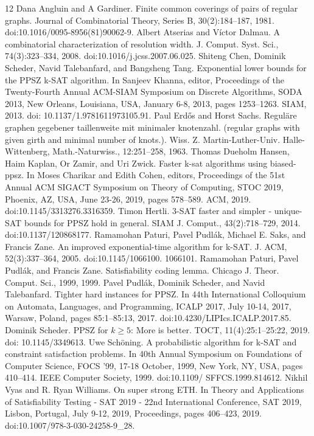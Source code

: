 \begin{thebibliography}{12}
 Dana Angluin and A Gardiner. Finite common coverings of pairs of regular graphs. Journal of Combinatorial Theory, Series B, 30(2):184–187, 1981. doi:10.1016/0095-8956(81)90062-9.
 Albert Atserias and Víctor Dalmau. A combinatorial characterization of resolution width. J. Comput. Syst. Sci., 74(3):323–334, 2008. doi:10.1016/j.jcss.2007.06.025.
 Shiteng Chen, Dominik Scheder, Navid Talebanfard, and Bangsheng Tang. Exponential lower bounds for the PPSZ k-SAT algorithm. In Sanjeev Khanna, editor, Proceedings of the Twenty-Fourth Annual ACM-SIAM Symposium on Discrete Algorithms, SODA 2013, New Orleans, Louisiana, USA, January 6-8, 2013, pages 1253–1263. SIAM, 2013. doi: 10.1137/1.9781611973105.91.
 Paul Erdős and Horst Sachs. Reguläre graphen gegebener taillenweite mit minimaler knotenzahl. (regular graphs with given girth and minimal number of knots.). Wiss. Z. Martin-Luther-Univ. Halle-Wittenberg, Math.-Naturwiss., 12:251–258, 1963.
 Thomas Dueholm Hansen, Haim Kaplan, Or Zamir, and Uri Zwick. Faster k-sat algorithms using biased-ppsz. In Moses Charikar and Edith Cohen, editors, Proceedings of the 51st Annual ACM SIGACT Symposium on Theory of Computing, STOC 2019, Phoenix, AZ, USA, June 23-26, 2019, pages 578–589. ACM, 2019. doi:10.1145/3313276.3316359.
 Timon Hertli. 3-SAT faster and simpler - unique-SAT bounds for PPSZ hold in general. SIAM J. Comput., 43(2):718–729, 2014. doi:10.1137/120868177.
 Ramamohan Paturi, Pavel Pudlák, Michael E. Saks, and Francis Zane. An improved exponential-time algorithm for k-SAT. J. ACM, 52(3):337–364, 2005. doi:10.1145/1066100. 1066101.
 Ramamohan Paturi, Pavel Pudlák, and Francis Zane. Satisfiability coding lemma. Chicago J. Theor. Comput. Sci., 1999, 1999.
 Pavel Pudlák, Dominik Scheder, and Navid Talebanfard. Tighter hard instances for PPSZ. In 44th International Colloquium on Automata, Languages, and Programming, ICALP 2017, July 10-14, 2017, Warsaw, Poland, pages 85:1–85:13, 2017. doi:10.4230/LIPIcs.ICALP.2017.85.
 Dominik Scheder. PPSZ for $k\ge5$: More is better. TOCT, 11(4):25:1–25:22, 2019. doi: 10.1145/3349613.
 Uwe Schöning. A probabilistic algorithm for k-SAT and constraint satisfaction problems. In 40th Annual Symposium on Foundations of Computer Science, FOCS ’99, 17-18 October, 1999, New York, NY, USA, pages 410–414. IEEE Computer Society, 1999. doi:10.1109/ SFFCS.1999.814612.
 Nikhil Vyas and R. Ryan Williams. On super strong ETH. In Theory and Applications of Satisfiability Testing - SAT 2019 - 22nd International Conference, SAT 2019, Lisbon, Portugal, July 9-12, 2019, Proceedings, pages 406–423, 2019. doi:10.1007/978-3-030-24258-9\_28.
\end{thebibliography}
